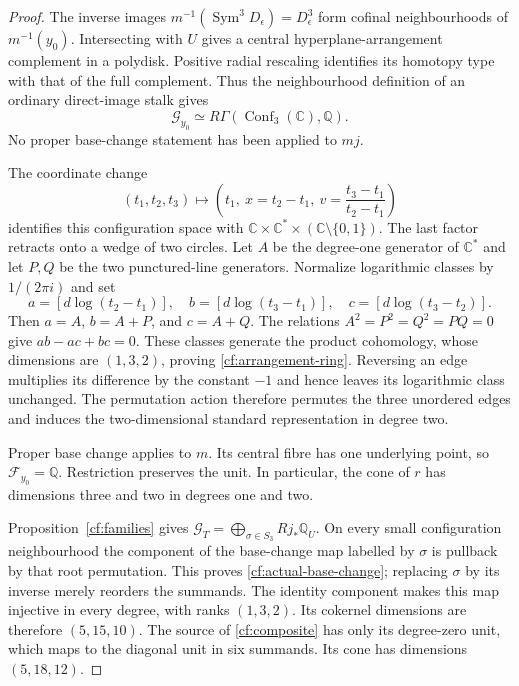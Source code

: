\begin{proof}
The inverse images
$m^{-1}(\operatorname{Sym}^3D_\epsilon)=D_\epsilon^3$ form
cofinal neighbourhoods of $m^{-1}(y_0)$. Intersecting with $U$
gives a central hyperplane-arrangement complement in a polydisk.
Positive radial rescaling identifies its homotopy type with that
of the full complement. Thus the neighbourhood definition of an
ordinary direct-image stalk gives
\[
 \mathcal G_{y_0}\simeq
 R\Gamma(\operatorname{Conf}_3(\mathbb C),\mathbb Q).
\]
No proper base-change statement has been applied to $mj$.

The coordinate change
\[
 (t_1,t_2,t_3)\longmapsto
 \left(t_1,\ x=t_2-t_1,\ v=\frac{t_3-t_1}{t_2-t_1}\right)
\]
identifies this configuration space with
$\mathbb C\times\mathbb C^*\times(\mathbb C\setminus\{0,1\})$.
The last factor retracts onto a wedge of two circles. Let $A$ be
the degree-one generator of $\mathbb C^*$ and let $P,Q$ be the
two punctured-line generators. Normalize logarithmic classes by
$1/(2\pi i)$ and set
\[
 a=[d\log(t_2-t_1)],\quad
 b=[d\log(t_3-t_1)],\quad
 c=[d\log(t_3-t_2)].
\]
Then $a=A$, $b=A+P$, and $c=A+Q$. The relations
$A^2=P^2=Q^2=PQ=0$ give $ab-ac+bc=0$.
These classes generate the product cohomology, whose dimensions
are $(1,3,2)$, proving \eqref{cf:arrangement-ring}.
Reversing an edge multiplies its difference by the constant $-1$
and hence leaves its logarithmic class unchanged. The permutation
action therefore permutes the three unordered edges and induces
the two-dimensional standard representation in degree two.

Proper base change applies to $m$. Its central fibre has one
underlying point, so $\mathcal F_{y_0}=\mathbb Q$. Restriction
preserves the unit. In particular, the cone of $r$ has dimensions
three and two in degrees one and two.

Proposition~\ref{cf:families} gives
$\mathcal G_T=\bigoplus_{\sigma\in S_3}Rj_*\mathbb Q_U$.
On every small configuration neighbourhood the component of the
base-change map labelled by $\sigma$ is pullback by that root
permutation. This proves \eqref{cf:actual-base-change}; replacing
$\sigma$ by its inverse merely reorders the summands.
The identity component makes this map injective in every degree,
with ranks $(1,3,2)$. Its cokernel dimensions are therefore
$(5,15,10)$. The source of \eqref{cf:composite} has only its
degree-zero unit, which maps to the diagonal unit in six summands.
Its cone has dimensions $(5,18,12)$.
\end{proof}

